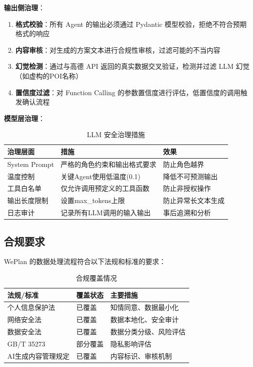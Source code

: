 \documentclass[12pt,a4paper]{ctexart}
\begin{document}
\textbf{输出侧治理}：

\begin{enumerate}[leftmargin=2em]
  \item \textbf{格式校验}：所有 Agent 的输出必须通过 Pydantic 模型校验，拒绝不符合预期格式的响应
  \item \textbf{内容审核}：对生成的方案文本进行合规性审核，过滤可能的不当内容
  \item \textbf{幻觉检测}：通过与高德 API 返回的真实数据交叉验证，检测并过滤 LLM 幻觉（如虚构的POI名称）
  \item \textbf{置信度过滤}：对 Function Calling 的参数置信度进行评估，低置信度的调用触发确认流程
\end{enumerate}

\textbf{模型层治理}：

\begin{table}[H]
\centering
\caption{LLM 安全治理措施}
\label{tab:llm-safety}
\renewcommand{\arraystretch}{1.3}
{\small
\begin{tabular}{p{3cm} p{4cm} p{5cm}}
\toprule
\textbf{治理层面} & \textbf{措施} & \textbf{效果} \\
\midrule
System Prompt & 严格的角色约束和输出格式要求 & 防止角色越界 \\
温度控制 & 关键Agent使用低温度(0.1) & 降低不可预测输出 \\
工具白名单 & 仅允许调用预定义的工具函数 & 防止非授权操作 \\
输出长度限制 & 设置max\_tokens上限 & 防止异常长文本生成 \\
日志审计 & 记录所有LLM调用的输入输出 & 事后追溯和分析 \\
\bottomrule
\end{tabular}
}
\end{table}

\subsection{合规要求}

WePlan 的数据处理流程符合以下法规和标准的要求：

\begin{table}[H]
\centering
\caption{合规覆盖情况}
\label{tab:compliance}
\renewcommand{\arraystretch}{1.3}
\begin{tabular}{p{4cm} p{3cm} p{5cm}}
\toprule
\textbf{法规/标准} & \textbf{覆盖状态} & \textbf{主要措施} \\
\midrule
个人信息保护法 & 已覆盖 & 知情同意、数据最小化 \\
网络安全法 & 已覆盖 & 数据本地化、安全审计 \\
数据安全法 & 已覆盖 & 数据分类分级、风险评估 \\
GB/T 35273 & 部分覆盖 & 隐私影响评估 \\
AI生成内容管理规定 & 已覆盖 & 内容标识、审核机制 \\
\bottomrule
\end{tabular}
\end{table}
\end{document}
